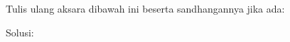 \item
Tulis ulang aksara dibawah ini beserta sandhangannya jika ada: \\
\begin{center}
{\java {} \quad {}  \quad {} \par}
\end{center}
\begin{description}
\item[Solusi:] \par
    \mbox{}
\begin{center}
{\java {} \quad {}  \quad {} \par}
\end{center}

\end{description}
